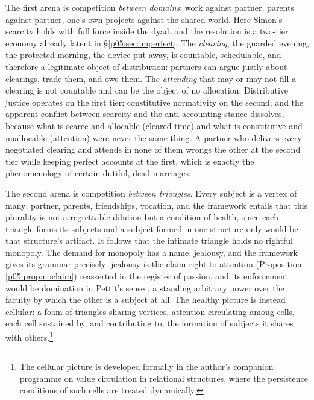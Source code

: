 \documentclass[11pt,a4paper]{article}
\theoremstyle{seriesthm}
\begin{document}
The first arena is competition \emph{between domains}: work against partner, parents against partner, one's own projects against the shared world. Here Simon's scarcity holds with full force inside the dyad, and the resolution is a two-tier economy already latent in §\ref{p05:sec:imperfect}. The \emph{clearing}, the guarded evening, the protected morning, the device put away, is countable, schedulable, and therefore a legitimate object of distribution: partners can argue justly about clearings, trade them, and owe them. The \emph{attending} that may or may not fill a clearing is not countable and can be the object of no allocation. Distributive justice operates on the first tier; constitutive normativity on the second; and the apparent conflict between scarcity and the anti-accounting stance dissolves, because what is scarce and allocable (cleared time) and what is constitutive and unallocable (attention) were never the same thing. A partner who delivers every negotiated clearing and attends in none of them wrongs the other at the second tier while keeping perfect accounts at the first, which is exactly the phenomenology of certain dutiful, dead marriages.

The second arena is competition \emph{between triangles}. Every subject is a vertex of many: partner, parents, friendships, vocation, and the framework entails that this plurality is not a regrettable dilution but a condition of health, since each triangle forms its subjects and a subject formed in one structure only would be that structure's artifact. It follows that the intimate triangle holds no rightful monopoly. The demand for monopoly has a name, jealousy, and the framework gives its grammar precisely: jealousy is the claim-right to attention (Proposition \ref{p05:prop:noclaim}) reasserted in the register of passion, and its enforcement would be domination in Pettit's sense \parencite{pettit1997}, a standing arbitrary power over the faculty by which the other is a subject at all. The healthy picture is instead cellular: a foam of triangles sharing vertices, attention circulating among cells, each cell sustained by, and contributing to, the formation of subjects it shares with others.\footnote{The cellular picture is developed formally in the author's companion programme on value circulation in relational structures, where the persistence conditions of such cells are treated dynamically.}
\end{document}
